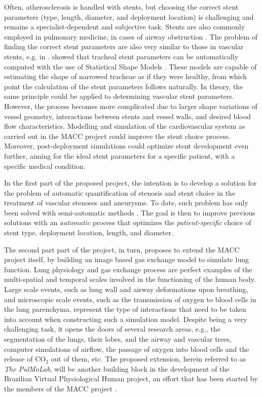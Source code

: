 Often, atherosclerosis is handled with stents, but choosing the correct stent parameters (type, length, diameter, and deployment location) is challenging and remains a specialist-dependent and subjective task. Stents are also commonly employed in pulmonary medicine, in cases of airway obstruction \citep{Chin,Freitag1,Freitag2,Freitag3,LeeP,Saito,Venuta}. The problem of finding the correct stent parameters are also very similar to those in vascular stents, e.g. in \citep{Bemmel}. \citet{Pinho:Trachea4} showed that tracheal stent parameters can be automatically computed with the use of Statistical Shape Models \citep{Cootes}. These models are capable of estimating the shape of narrowed tracheae as if they were healthy, from which point the calculation of the stent parameters follows naturally. In theory, the same principle could be applied to determining vascular stent parameters. However, the process becomes more complicated due to larger shape variations of vessel geometry, interactions between stents and vessel walls, and desired blood flow characteristics. Modelling and simulation of the cardiovascular system as carried out in the MACC project could improve the stent choice process. Moreover, post-deployment simulations could optimize stent development even further, aiming for the ideal stent parameters for a specific patient, with a specific medical condition. 

In the first part of the proposed project, the intention is to develop a solution for the problem of automatic quantification of stenosis and stent choice in the treatment of vascular stenoses and aneurysms. To date, such problem has only been solved with semi-automatic methods \citep{Gremse01092011,Scherl200721,HERN-06b,Bemmel}. The goal is then to improve previous solutions with an {\em automatic} process that optimizes the {\em patient-specific} choice of stent type, deployment location, length, and diameter. 

The second part part of the project, in turn, proposes to extend the MACC project itself, by building an image based gas exchange model to simulate lung function. Lung physiology and gas exchange process are perfect examples of the multi-spatial and temporal scales involved in the functioning of the human body. Large scale events, such as lung wall and airway deformations upon breathing, and microscopic scale events, such as the transmission of oxygen to blood cells in the lung parenchyma, represent the type of interactions that need to be taken into account when constructing such a simulation model. Despite being a very challenging task, it opens the doors of several research areas, e.g., the segmentation of the lungs, their lobes, and the airway and vascular trees, computer simulations of airflow, the passage of oxygen into blood cells and the release of CO$_2$ out of them, etc. The proposed extension, herein referred to as {\em The PulMoLab}, will be another building block in the development of the Brazilian Virtual Physiological Human project, an effort that has been started by the members of the MACC project \citep{Blanco2010,Blanco2009a,Blanco2012,Urquiza2006,Larrabide2007}. 

